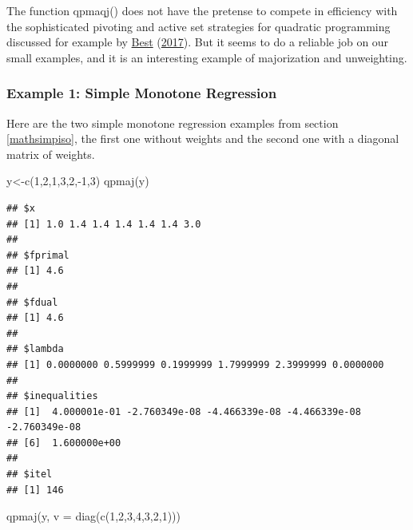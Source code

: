 \documentclass[
  12pt,
]{book}
\newenvironment{Shaded}{\begin{snugshade}}{\end{snugshade}}
\newcommand{\AttributeTok}[1]{\textcolor[rgb]{0.77,0.63,0.00}{#1}}
\newcommand{\DecValTok}[1]{\textcolor[rgb]{0.00,0.00,0.81}{#1}}
\newcommand{\FunctionTok}[1]{\textcolor[rgb]{0.00,0.00,0.00}{#1}}
\newcommand{\NormalTok}[1]{#1}
\newcommand{\OtherTok}[1]{\textcolor[rgb]{0.56,0.35,0.01}{#1}}
\newcommand{\SpecialCharTok}[1]{\textcolor[rgb]{0.00,0.00,0.00}{#1}}
\theoremstyle{definition}
\theoremstyle{definition}
\theoremstyle{definition}
\theoremstyle{definition}
\theoremstyle{remark}
\begin{document}
The function qpmaqj() does not have the pretense to compete in efficiency with the sophisticated pivoting and active set strategies for quadratic programming discussed for example by \protect\hyperlink{ref-best_17}{Best} (\protect\hyperlink{ref-best_17}{2017}). But it seems to do a reliable job on our small examples, and it is an interesting example of majorization and unweighting.

\hypertarget{example-1-simple-monotone-regression}{%
\subsubsection{Example 1: Simple Monotone Regression}\label{example-1-simple-monotone-regression}}

Here are the two simple monotone regression examples from section \ref{mathsimpiso}, the first one without weights and the second one with a diagonal matrix of weights.

\begin{Shaded}
\begin{Highlighting}[]
\NormalTok{y}\OtherTok{\textless{}{-}}\FunctionTok{c}\NormalTok{(}\DecValTok{1}\NormalTok{,}\DecValTok{2}\NormalTok{,}\DecValTok{1}\NormalTok{,}\DecValTok{3}\NormalTok{,}\DecValTok{2}\NormalTok{,}\SpecialCharTok{{-}}\DecValTok{1}\NormalTok{,}\DecValTok{3}\NormalTok{)}
\FunctionTok{qpmaj}\NormalTok{(y)}
\end{Highlighting}
\end{Shaded}

\begin{verbatim}
## $x
## [1] 1.0 1.4 1.4 1.4 1.4 1.4 3.0
## 
## $fprimal
## [1] 4.6
## 
## $fdual
## [1] 4.6
## 
## $lambda
## [1] 0.0000000 0.5999999 0.1999999 1.7999999 2.3999999 0.0000000
## 
## $inequalities
## [1]  4.000001e-01 -2.760349e-08 -4.466339e-08 -4.466339e-08 -2.760349e-08
## [6]  1.600000e+00
## 
## $itel
## [1] 146
\end{verbatim}

\begin{Shaded}
\begin{Highlighting}[]
\FunctionTok{qpmaj}\NormalTok{(y, }\AttributeTok{v =} \FunctionTok{diag}\NormalTok{(}\FunctionTok{c}\NormalTok{(}\DecValTok{1}\NormalTok{,}\DecValTok{2}\NormalTok{,}\DecValTok{3}\NormalTok{,}\DecValTok{4}\NormalTok{,}\DecValTok{3}\NormalTok{,}\DecValTok{2}\NormalTok{,}\DecValTok{1}\NormalTok{)))}
\end{Highlighting}
\end{Shaded}
\end{document}
